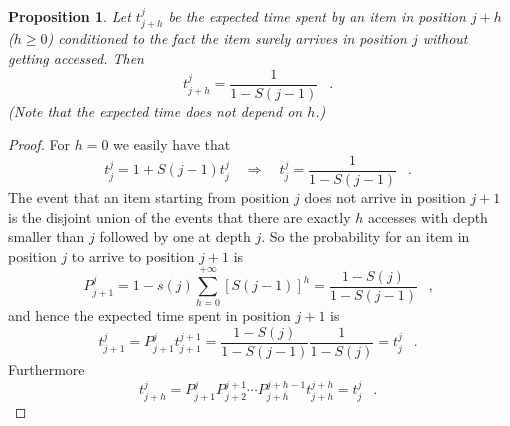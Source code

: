\documentclass[11pt,a4paper]{article}
\DeclareMathOperator{\mf}{\enspace .}
\DeclareMathOperator{\mc}{\enspace ,}
\newtheorem{proposition}{Proposition}
\theoremstyle{definition}
\theoremstyle{remark}
\begin{document}
\begin{proposition}
  \label{thm:time-spent-lrusm}
  Let $t^j_{j+h}$ be the expected time spent by an item in position $j+h$ ($h\geq
  0$) conditioned to the fact the item surely arrives in position $j$ without
  getting accessed. Then
  \begin{equation}
    t^j_{j+h} = \frac{1}{1-S(j-1)} \mf
  \end{equation}
  (Note that the expected time does not depend on $h$.)
\end{proposition}
\begin{proof}  For $h=0$ we easily have that
  \begin{equation}
    t_j^j=1+S(j-1) t_j^j \quad \Rightarrow \quad t_j^j=\frac{1}{1-S(j-1)}  \mf
  \end{equation}
  The event that an item starting from position $j$ does not arrive in position
  $j+1$ is the disjoint union of the events that there are exactly $h$ accesses
  with depth smaller than $j$ followed by one at depth $j$. So the probability
  for an item in position $j$ to arrive to position $j+1$ is
  \begin{equation}
    P_{j+1}^j=1-s(j)\sum_{h=0}^{+\infty}\left[S(j-1)\right]^h=\frac{1-S(j)}{1-S(j-1)}  \mc
  \end{equation}
  and hence the expected time spent in position $j+1$ is
  \begin{equation}
    t_{j+1}^j=P_{j+1}^j
    t_{j+1}^{j+1}=\frac{1-S(j)}{1-S(j-1)}\frac{1}{1-S(j)}=t_j^j  \mf
  \end{equation}
  Furthermore
  \begin{equation}
    t_{j+h}^j=P_{j+1}^j P_{j+2}^{j+1}\cdots P_{j+h}^{j+h-1}t_{j+h}^{j+h}=t_j^j  \mf
  \end{equation}
\end{proof}
\end{document}
